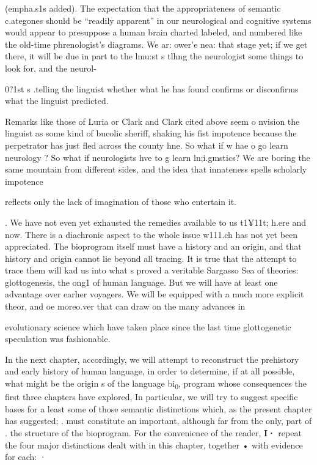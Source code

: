 (empha.s1s added). The expectation that the appropriateness of semantic c.ategones should be ``readily apparent'' in our neurological and cogni\-tive systems would appear to presuppose a human brain charted labeled, and numbered like the old-time phrenologist's diagrams. We ar: ower'e nea: that stage yet; if we get there, it will be due in part to the lmu:st s tlhng the neurologist some things to look for, and the neurol-

0?1st s .telling the linguist whether what he has found confirms or disconfirms what the linguist predicted.

Remarks like those of Luria or Clark and Clark cited above seem o nvision the linguist as some kind of bucolic sheriff, shaking his fist impotence because the perpetrator has just fled across the county hne. So what if w hae o go learn neurology ? So what if neurologists hve to g learn ln;i.gmstics? We are boring the same mountain from different sides, and the idea that innateness spells scholarly impotence

reflects only the lack of imagination of those who entertain it.

. We have not even yet exhausted the remedies available to us t1¥11t; h.ere and now. There is a diachronic aspect to the whole issue w111.ch has not yet been appreciated. The bioprogram itself must have a history and an origin, and that history and origin cannot lie beyond all tracing. It is true that the attempt to trace them will kad us into what s proved a veritable Sargasso Sea of theories: glottogenesis, the ong1 of human language. But we will have at least one advantage over earher voyagers. We will be equipped with a much more explicit theor, and oe moreo.ver that can draw on the many advances in

evolutionary science which have taken place since the last time glotto\-genetic speculation was fashionable.


In the next chapter, accordingly, we will attempt to reconstruct the prehistory and early history of human language, in order to deter\-mine, if at all possible, what might be the origin s of the language bi\textsubscript{0}, program whose consequences the first three chapters have explored, In particular, we will try to suggest specific bases for a least some of those semantic distinctions which, as the present chapter has suggested; . must constitute an important, although far from the only, part of . the structure of the bioprogram. For the convenience of the reader, \textbf{I·} repeat the four major distinctions dealt with in this chapter, together • with evidence for each: ·

